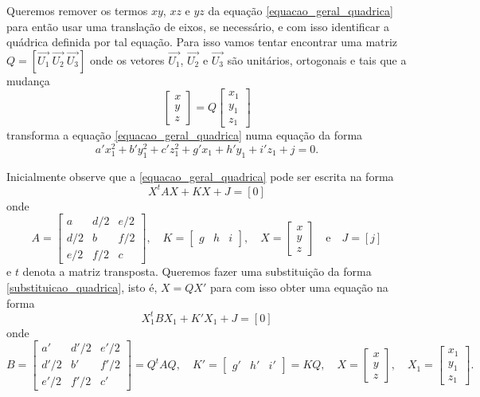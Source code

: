 Queremos remover os termos $xy$, $xz$ e $yz$ da equação \eqref{equacao_geral_quadrica} para então usar uma translação de eixos, se necessário, e com isso identificar a quádrica definida por tal equação. Para isso vamos tentar encontrar uma matriz $Q = [\vec{U_1}\ \vec{U_2}\ \vec{U_3}]$ onde os vetores $\vec{U_1}$, $\vec{U_2}$ e $\vec{U_3}$ são unitários, ortogonais e tais que a mudança
\begin{equation}\label{substituicao_quadrica}
	\begin{bmatrix}
		x\\
		y\\
		z
	\end{bmatrix} = Q \begin{bmatrix}
		x_1\\
		y_1\\
		z_1
	\end{bmatrix}
\end{equation}
transforma a equação \eqref{equacao_geral_quadrica} numa equação da forma
\begin{equation}\label{equacao_rotacionada_quadrica}
  a'x_1^2 + b'y_1^2 + c'z_1^2 + g'x_1 + h'y_1 + i'z_1 + j = 0.
\end{equation}

Inicialmente observe que a \eqref{equacao_geral_quadrica} pode ser escrita na forma
\begin{equation}\label{equacao_matricial_quadrica}
  X^tAX + KX + J = [0]
\end{equation}
onde
\[
  A = \begin{bmatrix}
    a & d/2 & e/2\\
    d/2 & b & f/2\\
    e/2 & f/2 & c
  \end{bmatrix}
, \quad K = \begin{bmatrix}
  g & h & i
\end{bmatrix}, \quad X = \begin{bmatrix}
  x\\
  y\\
  z
\end{bmatrix}\quad\mbox{e}\quad J = [j]
\]
e $t$ denota a matriz transposta. Queremos fazer uma substituição da forma \eqref{substituicao_quadrica}, isto é, $X = QX'$ para com isso obter uma equação na forma
\[
	X_1^tBX_1 + K'X_1 + J = [0]
\]
onde
\[
	B = \begin{bmatrix}
		a' & d'/2 & e'/2\\
		d'/2 & b' & f'/2\\
		e'/2 & f'/2 & c'
	\end{bmatrix} = Q^tAQ,\quad K' = \begin{bmatrix}
		g' & h' & i'
	\end{bmatrix} = KQ,\quad X = \begin{bmatrix}
		x\\y\\z
	\end{bmatrix},\quad X_1 = \begin{bmatrix}
		x_1\\y_1\\z_1
	\end{bmatrix}.
\]

